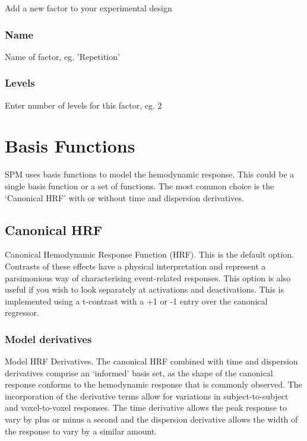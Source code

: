 Add a new factor to your experimental design

\subsubsection{Name}

Name of factor, eg. 'Repetition' 

\subsubsection{Levels}

Enter number of levels for this factor, eg. 2

\section{Basis Functions}

SPM uses basis functions to model the hemodynamic response. This could be a single basis function or a set of functions. The most common choice is the `Canonical HRF' with or without time and dispersion derivatives. 

\subsection{Canonical HRF}

Canonical Hemodynamic Response Function (HRF). This is the default option. Contrasts of these effects have a physical interpretation and represent a parsimonious way of characterising event-related responses. This option is also useful if you wish to look separately at activations and deactivations. This is implemented using a t-contrast with a +1 or -1 entry over the canonical regressor. 

\subsubsection{Model derivatives}

Model HRF Derivatives. The canonical HRF combined with time and dispersion derivatives comprise an `informed' basis set, as the shape of the canonical response conforms to the hemodynamic response that is commonly observed. The incorporation of the derivative terms allow for variations in subject-to-subject and voxel-to-voxel responses. The time derivative allows the peak response to vary by plus or minus a second and the dispersion derivative allows the width of the response to vary by a similar amount. 

